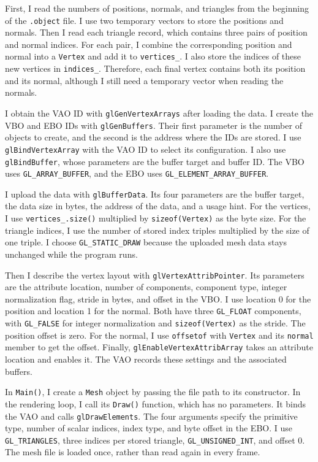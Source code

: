 \documentclass[acmtog]{acmart}
\begin{document}
First, I read the numbers of positions, normals, and triangles from the beginning of the \texttt{.object} file. I use two temporary vectors to store the positions and normals. Then I read each triangle record, which contains three pairs of position and normal indices. For each pair, I combine the corresponding position and normal into a \texttt{Vertex} and add it to \texttt{vertices\_}. I also store the indices of these new vertices in \texttt{indices\_}. Therefore, each final vertex contains both its position and its normal, although I still need a temporary vector when reading the normals.

I obtain the VAO ID with \texttt{glGenVertexArrays} after loading the data. I create the VBO and EBO IDs with \texttt{glGenBuffers}. Their first parameter is the number of objects to create, and the second is the address where the IDs are stored. I use \texttt{glBindVertexArray} with the VAO ID to select its configuration. I also use \texttt{glBindBuffer}, whose parameters are the buffer target and buffer ID. The VBO uses \texttt{GL\_ARRAY\_BUFFER}, and the EBO uses \texttt{GL\_ELEMENT\_ARRAY\_BUFFER}.

I upload the data with \texttt{glBufferData}. Its four parameters are the buffer target, the data size in bytes, the address of the data, and a usage hint. For the vertices, I use \texttt{vertices\_.size()} multiplied by \texttt{sizeof(Vertex)} as the byte size. For the triangle indices, I use the number of stored index triples multiplied by the size of one triple. I choose \texttt{GL\_STATIC\_DRAW} because the uploaded mesh data stays unchanged while the program runs.

Then I describe the vertex layout with \texttt{glVertexAttribPointer}. Its parameters are the attribute location, number of components, component type, integer normalization flag, stride in bytes, and offset in the VBO. I use location 0 for the position and location 1 for the normal. Both have three \texttt{GL\_FLOAT} components, with \texttt{GL\_FALSE} for integer normalization and \texttt{sizeof(Vertex)} as the stride. The position offset is zero. For the normal, I use \texttt{offsetof} with \texttt{Vertex} and its \texttt{normal} member to get the offset. Finally, \texttt{glEnableVertexAttribArray} takes an attribute location and enables it. The VAO records these settings and the associated buffers.

In \texttt{Main()}, I create a \texttt{Mesh} object by passing the file path to its constructor. In the rendering loop, I call its \texttt{Draw()} function, which has no parameters. It binds the VAO and calls \texttt{glDrawElements}. The four arguments specify the primitive type, number of scalar indices, index type, and byte offset in the EBO. I use \texttt{GL\_TRIANGLES}, three indices per stored triangle, \texttt{GL\_UNSIGNED\_INT}, and offset 0. The mesh file is loaded once, rather than read again in every frame.
\end{document}
